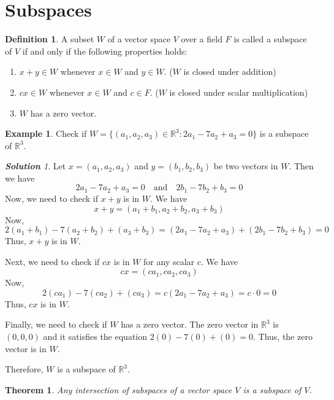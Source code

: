 \documentclass[12pt, a4paper]{article}
\newtheorem{theorem}{Theorem}[section]
\theoremstyle{definition}
\newtheorem{definition}{Definition}[section]
\newtheorem{example}{Example}[section]
\theoremstyle{remark}
\theoremstyle{solution}
\newtheorem*{solution}{\textbf{Solution}}
\begin{document}
\section{Subspaces}
\begin{definition}
    A subset $W$ of a vector space $V$ over a field $F$ is called a subspace of $V$ if and only if the following properties holds:
\end{definition}
\begin{enumerate}[label=(SS \arabic*), leftmargin=0.7in]
    \item $x+y \in W$ whenever $x \in W$ and $y \in W$. ($W$ is closed under addition)
    \item $cx \in W$ whenever $x \in W$ and $c \in F$. ($W$ is closed under scalar multiplication)
    \item $W$ has a zero vector.
\end{enumerate}

\begin{example}
    Check if $W = \{(a_1, a_2, a_3) \in \mathbb{R}^3 : 2a_1 - 7a_2 + a_3 = 0 \}$ is a subspace of $\mathbb{R}^3$.
\end{example}

\begin{solution}
    Let $x = (a_1, a_2, a_3)$ and $y = (b_1, b_2, b_3)$ be two vectors in $W$. Then we have
    \[
    2a_1 - 7a_2 + a_3 = 0 \quad \text{and} \quad 2b_1 - 7b_2 + b_3 = 0
    \]
    Now, we need to check if $x+y$ is in $W$. We have
    \[
    x+y = (a_1 + b_1, a_2 + b_2, a_3 + b_3)
    \]
    Now,
    \[
    2(a_1 + b_1) - 7(a_2 + b_2) + (a_3 + b_3) = (2a_1 - 7a_2 + a_3) + (2b_1 - 7b_2 + b_3) = 0
    \]
    Thus, $x+y$ is in $W$.

    Next, we need to check if $cx$ is in $W$ for any scalar $c$. We have
    \[
    cx = (ca_1, ca_2, ca_3)
    \]
    Now,
    \[
    2(ca_1) - 7(ca_2) + (ca_3) = c(2a_1 - 7a_2 + a_3) = c \cdot 0 = 0
    \]
    Thus, $cx$ is in $W$.

    Finally, we need to check if $W$ has a zero vector. The zero vector in $\mathbb{R}^3$ is $(0,0,0)$ and it satisfies the equation $2(0) - 7(0) + (0) = 0$. Thus, the zero vector is in $W$.

    Therefore, $W$ is a subspace of $\mathbb{R}^3$.
\end{solution}

\begin{theorem}
    Any intersection of subspaces of a vector space $V$ is a subspace of $V$.
\end{theorem}
\end{document}
